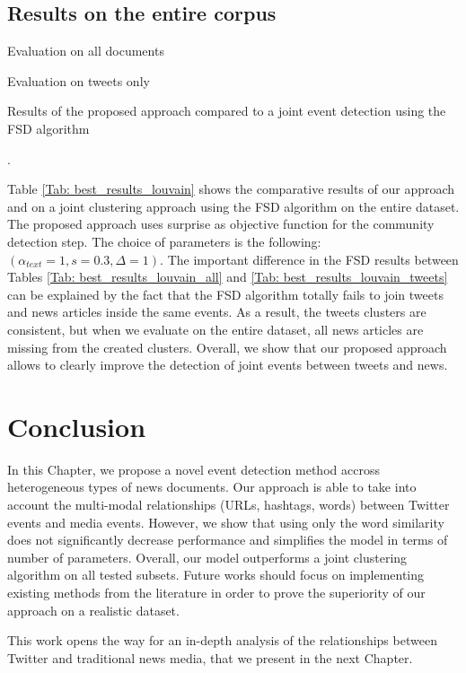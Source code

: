 \subsection{Results on the entire corpus}
\label{Joint_results}
\begin{table}[h]
\centering
\begin{subtable}{.5\textwidth}
  \centering
  
  \caption{Evaluation on all documents}
  \label{Tab: best_results_louvain_all}
\end{subtable}%
\begin{subtable}{.5\textwidth}
  \centering
  
  \caption{Evaluation on tweets only}
  \label{Tab: best_results_louvain_tweets}
\end{subtable}
\caption{Results of the proposed approach compared to a joint event detection using the FSD algorithm}.
\label{Tab: best_results_louvain}
\end{table}
Table \ref{Tab: best_results_louvain} shows the comparative results of our approach and on a joint clustering approach using the FSD algorithm on the entire dataset. The proposed approach uses surprise as objective function for the community detection step. The choice of parameters is the following: $(\alpha_{text}=1, s=0.3, \Delta=1)$. The important difference in the FSD results between Tables \ref{Tab: best_results_louvain_all} and \ref{Tab: best_results_louvain_tweets} can be explained by the fact that the FSD algorithm totally fails to join tweets and news articles inside the same events. As a result, the tweets clusters are consistent, but when we evaluate on the entire dataset, all news articles are missing from the created clusters. Overall, we show that our proposed approach allows to clearly improve the detection of joint events between tweets and news.


\section{Conclusion}
In this Chapter, we propose a novel event detection method accross heterogeneous types of news documents. Our approach is able to take into account the multi-modal relationships (URLs, hashtags, words) between Twitter events and media events. However, we show that using only the word similarity does not significantly decrease performance and simplifies the model in terms of number of parameters. Overall, our model outperforms a joint clustering algorithm on all tested subsets. Future works should focus on implementing existing methods from the literature \citep{mele_linking_2017, hua_topical_2016} in order to prove the superiority of our approach on a realistic dataset.

This work opens the way for an in-depth analysis of the relationships between Twitter and traditional news media, that we present in the next Chapter.